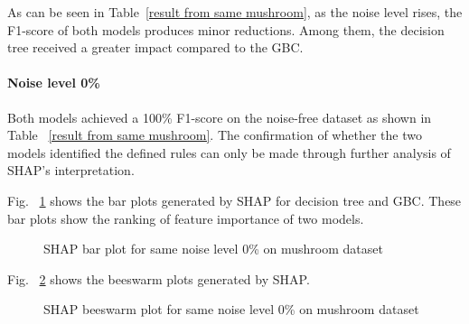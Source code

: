 \documentclass[runningheads,a4paper]{llncs}
\begin{document}
As can be seen in Table~\ref{result from same mushroom}, as the noise level rises, the F1-score of both models produces minor reductions. Among them, the decision tree received a greater impact compared to the GBC.

\paragraph{Noise level 0\%}
Both models achieved a 100\% F1-score on the noise-free dataset as shown in Table ~\ref{result from same mushroom}. The confirmation of whether the two models identified the defined rules can only be made through further analysis of SHAP's interpretation.

Fig. ~\ref{bar plots noise level 0} shows the bar plots generated by SHAP for decision tree and GBC. These bar plots show the ranking of feature importance of two models.
\begin{figure}[H]
	\centering
	
	\hfill
	
	
	\caption{SHAP bar plot for same noise level 0\% on mushroom dataset}
	\label{bar plots noise level 0}
\end{figure}



Fig. ~\ref{bee plots noise level 0} shows the beeswarm plots generated by SHAP.
\begin{figure}[H]
	\centering
	
	\hfill
	
	
	\caption{SHAP beeswarm plot for same noise level 0\% on mushroom dataset}
	\label{bee plots noise level 0}

\end{figure}
\end{document}
